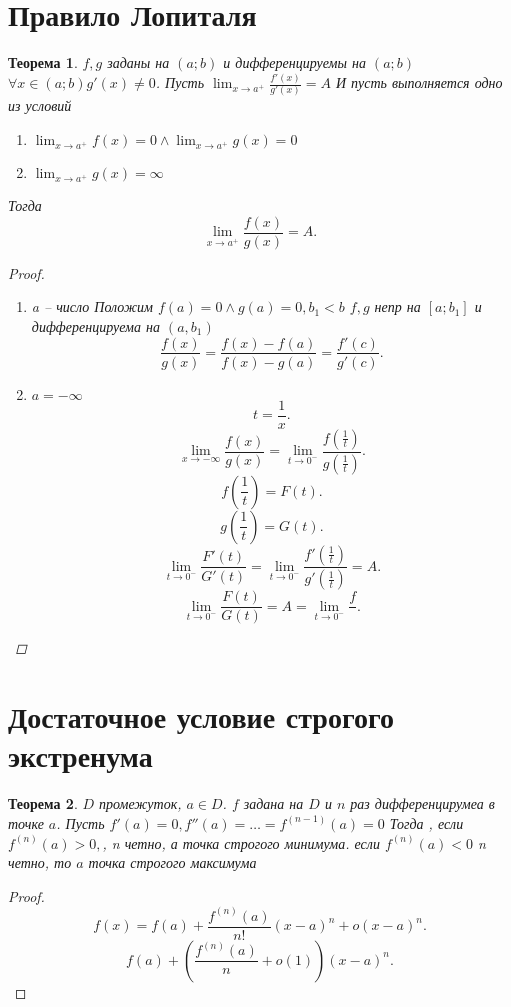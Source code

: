 \documentclass[a4paper]{scrartcl}
\newtheorem{theorem}{Теорема}
\begin{document}
    \section{Правило Лопиталя}
    \begin{theorem}
        $f,g$ заданы на  $(a;b)$ и дифференцируемы на $(a;b)$  $\forall  x \in (a;b) g'(x)  \neq 0$. Пусть
         $\lim_{x \to a^+} \frac{f'(x)}{g'(x)} = A $
         И пусть выполняется одно из условий
         \begin{enumerate}
             \item $\lim_{x \to a^+} f(x) = 0 \land \lim_{x \to a^+} g(x) = 0 $ 
            \item
                $\lim_{x \to a^+} g(x) = \infty$
         \end{enumerate}
         Тогда
         \[
         \lim_{x \to a^+} \frac{f(x)}{g(x)} = A
         .\] 
         \begin{proof}
             \begin{enumerate}
                 \item a -- число
                     Положим $f(a) = 0 \land g(a) = 0, b_1 < b$
                     $f,g$ непр на  $[a;b_1]$ и дифференцируема на $(a,b_1)$ 
                     \[
                     \frac{f(x)}{g(x)} = \frac{f(x) - f(a)}{f(x) - g(a)} = \frac{f'(c)}{g'(c)}
                     .\] 
                \item $a = - \infty$
                     \[
                    t = \frac{1}{x}
                    .\] 
                    \[
                    \lim_{x \to -\infty} \frac{f(x)}{g(x)} = \lim_{t \to 0^-} \frac{f(\frac{1}{t})}{g(\frac{1}{t})}
                    .\] 
                    \[
                    f(\frac{1}{t}) = F(t)
                    .\] 
                    \[
                    g(\frac{1}{t}) = G(t)
                    .\] 
                    \[
                    \lim_{t \to 0^-}  \frac{F'(t)}{G'(t)} = \lim_{t \to 0^-} \frac{f'(\frac{1}{t})}{g'(\frac{1}{t})} = A
                    .\] 
                    \[
                    \lim_{t \to 0^-} \frac{F(t)}{G(t)} = A = \lim_{t \to 0^-} \frac{f}{}
                    .\] 
             \end{enumerate}
         \end{proof}
    \end{theorem}
    \section{Достаточное условие строгого экстренума}
    \begin{theorem}
        $D$ промежуток,  $a \in D$. $f $ задана на  $D$ и  $n$ раз дифференцирумеа в точке  $a$. Пусть  $f'(a) = 0, f''(a) = \dots = f^(n - 1)(a) = 0$
        Тогда , если $f^{(n)}(a) > 0,$, n четно, а точка строгого минимума. если  $f^{(n)}(a) < 0$ n четно, то  $a$ точка строгого максимума
    \end{theorem}
    \begin{proof}
        \[
            f(x) = f(a) + \frac{f^{( n )}(a)}{n!}(x - a)^n + o(x - a)^n
        .\] 
        \[
            f(a) + (\frac{f^{(n)}(a)}{n} + o(1))(x -a)^n
        .\] 
    \end{proof}
\end{document}
